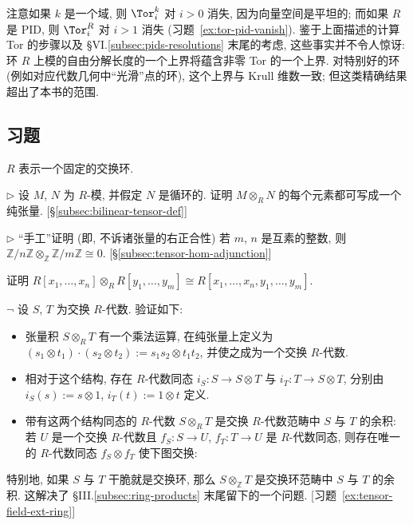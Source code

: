 注意如果 $k$ 是一个域, 则 $\Tor_i^k$ 对 $i>0$ 消失, 因为向量空间是平坦的; 而如果 $R$ 是 PID, 则 $\Tor_i^R$ 对 $i>1$ 消失 (习题~\ref{ex:tor-pid-vanish}). 鉴于上面描述的计算 Tor 的步骤以及 §VI.\ref{subsec:pids-resolutions} 末尾的考虑, 这些事实并不令人惊讶: 环 $R$ 上模的自由分解长度的一个上界将蕴含非零 Tor 的一个上界. 对特别好的环 (例如对应代数几何中``光滑''点的环), 这个上界与 Krull 维数一致; 但这类精确结果超出了本书的范围.

\subsection*{习题}
{}

$R$ 表示一个固定的交换环.

\begin{prob}\label{ex:tensor-cyclic-pure}
$\triangleright$ 设 $M$, $N$ 为 $R$-模, 并假定 $N$ 是循环的. 证明 $M\otimes_R N$ 的每个元素都可写成一个纯张量. [\S\ref{subsec:bilinear-tensor-def}]
\end{prob}

\begin{prob}\label{ex:tensor-zm-zn-zero}
$\triangleright$ ``手工''证明 (即, 不诉诸张量的右正合性) 若 $m$, $n$ 是互素的整数, 则 $\mathbb{Z}/n\mathbb{Z}\otimes_{\mathbb{Z}}\mathbb{Z}/m\mathbb{Z}\cong 0$. [\S\ref{subsec:tensor-hom-adjunction}]
\end{prob}

\begin{prob}\label{ex:tensor-poly-rings}
证明 $R[x_1,\dots,x_n]\otimes_R R[y_1,\dots,y_m]\cong R[x_1,\dots,x_n,y_1,\dots,y_m]$.
\end{prob}

\begin{prob}\label{ex:tensor-ralgebra-coproduct}
$\neg$ 设 $S$, $T$ 为交换 $R$-代数. 验证如下:
\begin{itemize}
\item 张量积 $S\otimes_R T$ 有一个乘法运算, 在纯张量上定义为 $(s_1\otimes t_1)\cdot(s_2\otimes t_2):=s_1s_2\otimes t_1t_2$, 并使之成为一个交换 $R$-代数.
\item 相对于这个结构, 存在 $R$-代数同态 $i_S:S\to S\otimes T$ 与 $i_T:T\to S\otimes T$, 分别由 $i_S(s):=s\otimes 1$, $i_T(t):=1\otimes t$ 定义.
\item 带有这两个结构同态的 $R$-代数 $S\otimes_R T$ 是交换 $R$-代数范畴中 $S$ 与 $T$ 的余积: 若 $U$ 是一个交换 $R$-代数且 $f_S:S\to U$, $f_T:T\to U$ 是 $R$-代数同态, 则存在唯一的 $R$-代数同态 $f_S\otimes f_T$ 使下图交换:
\begin{center}
\end{center}
\end{itemize}
特别地, 如果 $S$ 与 $T$ 干脆就是交换环, 那么 $S\otimes_{\mathbb{Z}}T$ 是交换环范畴中 $S$ 与 $T$ 的余积. 这解决了 §III.\ref{subsec:ring-products} 末尾留下的一个问题. [习题~\ref{ex:tensor-field-ext-ring}]
\end{prob}

